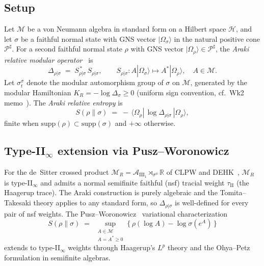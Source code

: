 \documentclass[12pt,a4paper]{article}
\theoremstyle{definition}
\begin{document}
\subsection{Setup}
Let $\mathcal{M}$ be a von Neumann algebra in standard form on a Hilbert
space $\mathcal{H}$, and let $\sigma$ be a faithful normal state with
GNS vector $|\Omega_\sigma\rangle$ in the natural positive cone
$\mathcal{P}^\sharp$. For a second faithful normal state $\rho$ with
GNS vector $|\Omega_\rho\rangle\in\mathcal{P}^\sharp$, the
\emph{Araki relative modular operator}~\cite{Araki1976} is
\begin{equation}
   \Delta_{\rho|\sigma}
   \;=\; S_{\rho|\sigma}^{\,*}\,S_{\rho|\sigma},
   \qquad
   S_{\rho|\sigma} : A|\Omega_\sigma\rangle \longmapsto
                      A^*|\Omega_\rho\rangle ,\quad A\in\mathcal{M}.
\end{equation}
Let $\sigma^\sigma_t$ denote the modular automorphism group of $\sigma$
on $\mathcal{M}$, generated by the modular Hamiltonian
$K_R = -\log\Delta_\sigma\geq 0$ (uniform sign convention, cf.~Wk2
memo~\cite{EREPR_Araki_Wk2}). The \emph{Araki relative entropy} is
\begin{equation}
   S(\rho\|\sigma)
   \;=\; -\,\langle\Omega_\rho |\,\log\Delta_{\rho|\sigma}\,|\Omega_\rho\rangle ,
   \label{eq:araki-rel-entropy}
\end{equation}
finite when $\mathrm{supp}(\rho)\subset\mathrm{supp}(\sigma)$ and $+\infty$
otherwise.

\subsection{Type-II$_\infty$ extension via Pusz--Woronowicz}
For the de~Sitter crossed product $\mathcal{M}_R=
\mathcal{A}_{\mathrm{III}_1}\rtimes_{\sigma^\phi}\mathbb{R}$ of CLPW
\cite{CLPW2023} and DEHK~\cite{DEHK2025a}, $\mathcal{M}_R$ is type-II$_\infty$
and admits a normal semifinite faithful (nsf) tracial weight $\tau_{\mathrm{II}}$
(the Haagerup trace). The Araki construction is purely algebraic and the
Tomita--Takesaki theory applies to any standard form, so $\Delta_{\rho|\sigma}$
is well-defined for every pair of nsf weights. The
Pusz--Woronowicz~\cite{PuszWoronowicz1978} variational characterization
\begin{equation}
   S(\rho\|\sigma)
   \;=\; \sup_{\substack{A\in\mathcal{M}\\ A=A^*\geq 0}}
         \bigl\{\,\rho(\log A) - \log\sigma(e^A)\,\bigr\}
\end{equation}
extends to type-II$_\infty$ weights through Haagerup's $L^p$ theory and
the Ohya--Petz~\cite{OhyaPetz1993} formulation in semifinite algebras.
\end{document}
